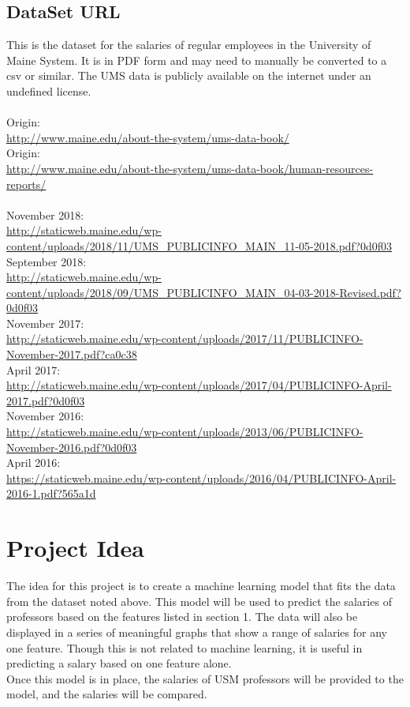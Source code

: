 \documentclass[14pt, letterpaper]{extarticle}
\begin{document}
        \subsection{DataSet URL}
        This is the dataset for the salaries of regular employees in the University of Maine System. It is in PDF form and may need to manually be converted to a csv or similar. The UMS data is publicly available on the internet under an undefined license. 
        \\~\\
        Origin:\\ 
        \url{http://www.maine.edu/about-the-system/ums-data-book/}\\
        Origin:\\ %
        \url{http://www.maine.edu/about-the-system/ums-data-book/human-resources-reports/}
        \\~\\ %
        November 2018:\\ 
        \url{http://staticweb.maine.edu/wp-content/uploads/2018/11/UMS_PUBLICINFO_MAIN_11-05-2018.pdf?0d0f03}\\
        September 2018:\\ 
        \url{http://staticweb.maine.edu/wp-content/uploads/2018/09/UMS_PUBLICINFO_MAIN_04-03-2018-Revised.pdf?0d0f03}\\
        November 2017:\\ 
        \url{http://staticweb.maine.edu/wp-content/uploads/2017/11/PUBLICINFO-November-2017.pdf?ca0c38}\\
        April 2017:\\ 
        \url{http://staticweb.maine.edu/wp-content/uploads/2017/04/PUBLICINFO-April-2017.pdf?0d0f03}\\
        November 2016:\\
        \url{http://staticweb.maine.edu/wp-content/uploads/2013/06/PUBLICINFO-November-2016.pdf?0d0f03}\\
        April 2016:\\
        \url{https://staticweb.maine.edu/wp-content/uploads/2016/04/PUBLICINFO-April-2016-1.pdf?565a1d}\\
 
        
        \section{Project Idea}
        The idea for this project is to create a machine learning model that fits the data from the dataset noted above. This model will be used to predict the salaries of professors based on the features listed in section 1. The data will also be displayed in a series of meaningful graphs that show a range of salaries for any one feature. Though this is not related to machine learning, it is useful in predicting a salary based on one feature alone. \\
        \bigskip
        Once this model is in place, the salaries of USM professors will be provided to the model, and the salaries will be compared. 
\end{document}
